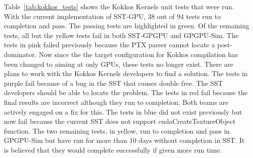 Table~\ref{tab:kokkos_tests} shows the Kokkos Kernels unit tests that were run.
With the current implementation of SST-GPU, 38 out of 94 tests run to completion
and pass. The passing tests are highlighted in green. Of the remaining tests,
all but the yellow tests fail in both SST-GPGPU and GPGPU-Sim. The tests in pink
failed previously because the PTX parser cannot locate a post-dominator. Now since
the the target configuration for Kokkos compilation has been changed 
to aiming at only GPUs, these tests no longer exist. There
are plans to work with the Kokkos Kernels developers to find a solution. The
tests in purple fail because of a bug in the SST that causes double free. 
The SST developers should be able to locate the problem. The tests in red fail because
the final results are incorrect although they run to completion. Both teams are actively
engaged on a fix for this. The tests in blue did not exist previously but now fail 
because the current SST does not support cudaCreateTextureObject function. 
The two remaining tests, in yellow, run to completion
and pass in GPGPU-Sim but have run for more than 10 days without completion in SST. 
It is believed that they would complete successfully if given more run time.

